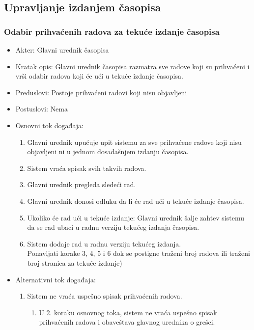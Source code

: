 \documentclass[a4paper]{article}
\begin{document}
\subsection{Upravljanje izdanjem časopisa}

\subsubsection{Odabir prihvaćenih radova za tekuće izdanje časopisa}
\begin{itemize}
    \item Akter: Glavni urednik časopisa
    \item Kratak opis: Glavni urednik časopisa razmatra sve radove koji su prihvaćeni i vrši odabir radova koji će ući u tekuće izdanje časopisa.
    \item Preduslovi: Postoje prihvaćeni radovi koji nisu objavljeni
    \item Postuslovi: Nema
    \item Osnovni tok događaja:
        \begin{enumerate}
            \item Glavni urednik upućuje upit sistemu za sve prihvaćene radove koji nisu objavljeni ni u jednom dosadašnjem izdanju časopisa.
            \item Sistem vraća spisak svih takvih radova.
            \item Glavni urednik pregleda sledeći rad.
            \item Glavni urednik donosi odluku da li će rad ući u tekuće izdanje časopisa.
            \item Ukoliko će rad ući u tekuće izdanje: Glavni urednik šalje zahtev sistemu da se rad ubaci u radnu verziju tekućeg izdanja časopisa.
            \item Sistem dodaje rad u radnu verziju tekućeg izdanja.\\ Ponavljati korake 3, 4, 5 i 6 dok se postigne traženi broj radova ili traženi broj stranica za tekuće izdanje)
        \end{enumerate}
    \item Alternativni tok događaja:
        \begin{enumerate}
            \item Sistem ne vraća uspešno spisak prihvaćenih radova.
                \begin{enumerate}
                    \item U 2. koraku osnovnog toka, sistem ne vraća uspešno spisak prihvaćenih radova i obaveštava glavnog urednika o grešci.

\end{enumerate}
\end{enumerate}
\end{itemize}
\end{document}
